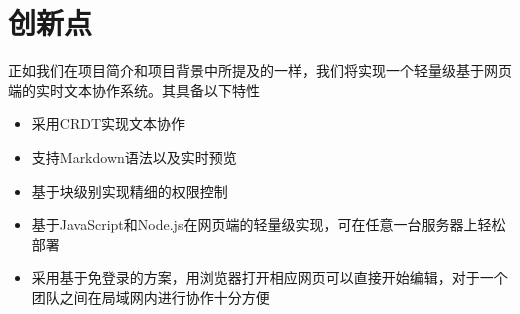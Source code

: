 \documentclass[11pt]{ctexart}
\begin{document}
\section{创新点}
正如我们在项目简介和项目背景中所提及的一样，我们将实现一个轻量级基于网页端的实时文本协作系统。其具备以下特性
\begin{itemize}
	\item 采用CRDT实现文本协作
	\item 支持Markdown语法以及实时预览 
	\item 基于块级别实现精细的权限控制
	\item 基于JavaScript和Node.js在网页端的轻量级实现，可在任意一台服务器上轻松部署
	\item 采用基于免登录的方案，用浏览器打开相应网页可以直接开始编辑，对于一个团队之间在局域网内进行协作十分方便
\end{itemize}
\nocite{*}


\end{document}
